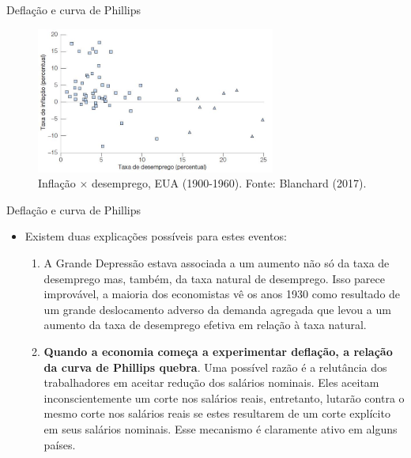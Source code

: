 \documentclass[10pt]{beamer}
\begin{document}
\begin{frame}{Deflação e curva de Phillips}
    \begin{figure}
        \centering
        \includegraphics[width=0.7\textwidth]{./figures/macro14_fig5.JPG}
        \caption{Inflação $\times$ desemprego, EUA (1900-1960). Fonte: Blanchard (2017).}
        \label{fig4}
    \end{figure}
\end{frame}

\begin{frame}{Deflação e curva de Phillips}
    \begin{itemize}
        \item Existem duas explicações possíveis para estes eventos:
        \bigskip
        \begin{enumerate}
            \item A Grande Depressão estava associada a um aumento não só da taxa de desemprego mas, também, da taxa natural de desemprego. Isso parece improvável, a maioria dos economistas vê os anos 1930 como resultado de um grande deslocamento adverso da demanda agregada que levou a um aumento da taxa de desemprego efetiva em relação à taxa natural.
            \bigskip
            \item \textbf{Quando a economia começa a experimentar deflação, a relação da curva de Phillips quebra}. Uma possível razão é a relutância dos trabalhadores em aceitar redução dos salários nominais. Eles aceitam inconscientemente um corte nos salários reais, entretanto, lutarão contra o mesmo corte nos salários reais se estes resultarem de um corte explícito em seus salários nominais. Esse mecanismo é claramente ativo em alguns países.
        \end{enumerate}
    \end{itemize}
\end{frame}
\end{document}
